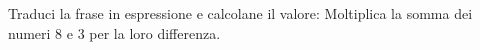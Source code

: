 \item Traduci la frase in espressione e calcolane il valore: Moltiplica la somma dei numeri 8 e 3 per la loro differenza.